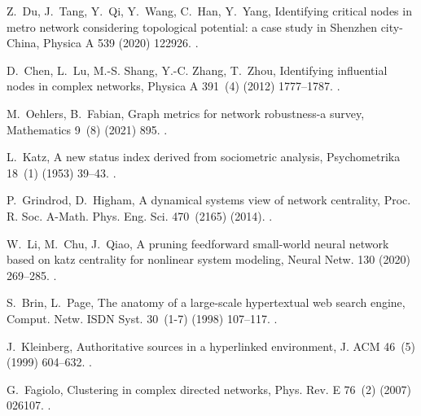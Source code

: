 \documentclass[preprint,3p,times,sort&compress]{elsarticle}
\begin{document}
\begin{thebibliography}{10}
Z.~Du, J.~Tang, Y.~Qi, Y.~Wang, C.~Han, Y.~Yang, Identifying critical nodes in
  metro network considering topological potential: a case study in {S}henzhen
  city-{C}hina, Physica A 539 (2020) 122926.
\newblock \href {https://doi.org/10.1016/j.physa.2019.122926}
  {}.

D.~Chen, L.~Lu, M.-S. Shang, Y.-C. Zhang, T.~Zhou, Identifying influential
  nodes in complex networks, Physica A 391~(4) (2012) 1777--1787.
\newblock \href {https://doi.org/10.1016/j.physa.2011.09.017}
  {}.

M.~Oehlers, B.~Fabian, Graph metrics for network robustness-a survey,
  Mathematics 9~(8) (2021) 895.
\newblock \href {https://doi.org/10.3390/math9080895}
  {}.

L.~Katz, A new status index derived from sociometric analysis, Psychometrika
  18~(1) (1953) 39--43.
\newblock \href {https://doi.org/10.1193/1.1623497}
  {}.

P.~Grindrod, D.~Higham, A dynamical systems view of network centrality, Proc.
  R. Soc. A-Math. Phys. Eng. Sci. 470~(2165) (2014).
\newblock \href {https://doi.org/10.1098/rspa.2013.0835}
  {}.

W.~Li, M.~Chu, J.~Qiao, A pruning feedforward small-world neural network based
  on katz centrality for nonlinear system modeling, Neural Netw. 130 (2020)
  269--285.
\newblock \href {https://doi.org/10.1016/j.neunet.2020.07.017}
  {}.

S.~Brin, L.~Page, The anatomy of a large-scale hypertextual web search engine,
  Comput. Netw. ISDN Syst. 30~(1-7) (1998) 107--117.
\newblock \href {https://doi.org/10.1016/S0169-7552(98)00110-X}
  {}.

J.~Kleinberg, Authoritative sources in a hyperlinked environment, J. ACM 46~(5)
  (1999) 604--632.
\newblock \href {https://doi.org/10.1145/324133.324140}
  {}.

G.~Fagiolo, Clustering in complex directed networks, Phys. Rev. E 76~(2) (2007)
  026107.
\newblock \href {https://doi.org/10.1103/PhysRevE.76.026107}
  {}.


\end{thebibliography}
\end{document}
